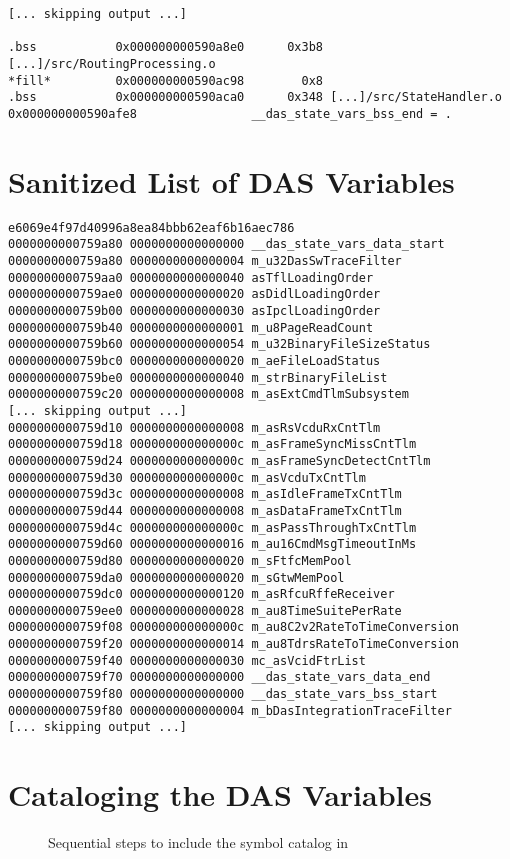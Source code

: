 {{\begin{verbatim}
[... skipping output ...]

.bss           0x000000000590a8e0      0x3b8 [...]/src/RoutingProcessing.o
*fill*         0x000000000590ac98        0x8 
.bss           0x000000000590aca0      0x348 [...]/src/StateHandler.o
0x000000000590afe8                __das_state_vars_bss_end = .
\end{verbatim}
}
\chapter{Sanitized List of DAS Variables}\label{das-symbol-catalog}

{\small
\begin{verbatim}
e6069e4f97d40996a8ea84bbb62eaf6b16aec786
0000000000759a80 0000000000000000 __das_state_vars_data_start
0000000000759a80 0000000000000004 m_u32DasSwTraceFilter
0000000000759aa0 0000000000000040 asTflLoadingOrder
0000000000759ae0 0000000000000020 asDidlLoadingOrder
0000000000759b00 0000000000000030 asIpclLoadingOrder
0000000000759b40 0000000000000001 m_u8PageReadCount
0000000000759b60 0000000000000054 m_u32BinaryFileSizeStatus
0000000000759bc0 0000000000000020 m_aeFileLoadStatus
0000000000759be0 0000000000000040 m_strBinaryFileList
0000000000759c20 0000000000000008 m_asExtCmdTlmSubsystem
[... skipping output ...]
0000000000759d10 0000000000000008 m_asRsVcduRxCntTlm
0000000000759d18 000000000000000c m_asFrameSyncMissCntTlm
0000000000759d24 000000000000000c m_asFrameSyncDetectCntTlm
0000000000759d30 000000000000000c m_asVcduTxCntTlm
0000000000759d3c 0000000000000008 m_asIdleFrameTxCntTlm
0000000000759d44 0000000000000008 m_asDataFrameTxCntTlm
0000000000759d4c 000000000000000c m_asPassThroughTxCntTlm
0000000000759d60 0000000000000016 m_au16CmdMsgTimeoutInMs
0000000000759d80 0000000000000020 m_sFtfcMemPool
0000000000759da0 0000000000000020 m_sGtwMemPool
0000000000759dc0 0000000000000120 m_asRfcuRffeReceiver
0000000000759ee0 0000000000000028 m_au8TimeSuitePerRate
0000000000759f08 000000000000000c m_au8C2v2RateToTimeConversion
0000000000759f20 0000000000000014 m_au8TdrsRateToTimeConversion
0000000000759f40 0000000000000030 mc_asVcidFtrList
0000000000759f70 0000000000000000 __das_state_vars_data_end
0000000000759f80 0000000000000000 __das_state_vars_bss_start
0000000000759f80 0000000000000004 m_bDasIntegrationTraceFilter
[... skipping output ...]

\end{verbatim}
}

\chapter{Cataloging the DAS Variables}
\begin{figure}[H]
	\centering
	
	\caption{Sequential steps to include the symbol catalog in }
	\label{fig:blackbox-diagram}
\end{figure}


}